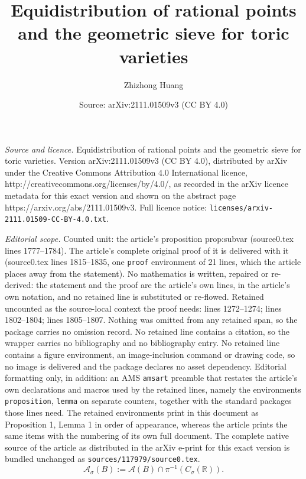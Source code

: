 \documentclass[10pt,a4paper]{amsart}
\title{Equidistribution of rational points and the geometric sieve for toric varieties}
\author{Zhizhong Huang}
\date{Source: arXiv:2111.01509v3 (CC BY 4.0)}
\newcommand{\BR}{{\mathbb {R}}}
\newcommand{\CA}{{\mathcal {A}}}
\begin{document}
\maketitle

\noindent\emph{Source and licence.} Equidistribution of rational points and the geometric sieve for toric varieties. Version arXiv:2111.01509v3 (CC BY 4.0), distributed by arXiv under the Creative Commons Attribution 4.0 International licence, http://creativecommons.org/licenses/by/4.0/, as recorded in the arXiv licence metadata for this exact version and shown on the abstract page https://arxiv.org/abs/2111.01509v3. Full licence notice: \texttt{licenses/arxiv-2111.01509-CC-BY-4.0.txt}.\par\smallskip

\noindent\textit{Editorial scope.} Counted unit: the article's proposition prop:subvar (source0.tex lines 1777--1784). The article's complete original proof of it is delivered with it (source0.tex lines 1815--1835, one \texttt{proof} environment of 21 lines, which the article places away from the statement). No mathematics is written, repaired or re-derived: the statement and the proof are the article's own lines, in the article's own notation, and no retained line is substituted or re-flowed.  Retained uncounted as the source-local context the proof needs: lines 1272--1274; lines 1802--1804; lines 1805--1807.  Nothing was omitted from any retained span, so the package carries no omission record.  No retained line contains a citation, so the wrapper carries no bibliography and no bibliography entry.  No retained line contains a figure environment, an image-inclusion command or drawing code, so no image is delivered and the package declares no asset dependency.  Editorial formatting only, in addition: an AMS \texttt{amsart} preamble that restates the article's own declarations and macros used by the retained lines, namely the environments \texttt{proposition}, \texttt{lemma} on separate counters, together with the standard packages those lines need.  The retained environments print in this document as Proposition 1, Lemma 1 in order of appearance, whereas the article prints the same items with the numbering of its own full document.  The complete native source of the article as distributed in the arXiv e-print for this exact version is bundled unchanged as \texttt{sources/117979/source0.tex}.
\begin{equation}\label{eq:CAsigmaB}
	\CA_\sigma(B):=\CA(B)\cap \pi^{-1}(C_{\sigma}(\BR)).
\end{equation} 
\end{document}
